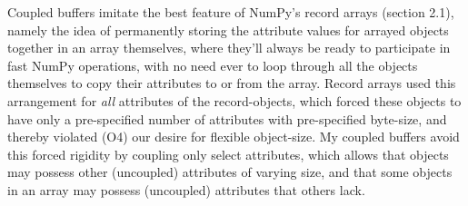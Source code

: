 \documentclass[letterpaper,compsoc,twoside]{IEEEtran}
\begin{document}
Coupled buffers imitate the best feature of NumPy's record arrays (section 2.1), namely the idea of permanently storing the attribute values for arrayed objects together in an array themselves, where they'll always be ready to participate in fast NumPy operations, with no need ever to loop through all the objects themselves to copy their attributes to or from the array.  Record arrays used this arrangement for \emph{all} attributes of the record-objects, which forced these objects to have only a pre-specified number of attributes with pre-specified byte-size, and thereby violated (O4) our desire for flexible object-size.  My coupled buffers avoid this forced rigidity by coupling only select attributes, which allows that objects may possess other (uncoupled) attributes of varying size, and that some objects in an array may possess (uncoupled) attributes that others lack.
\end{document}
